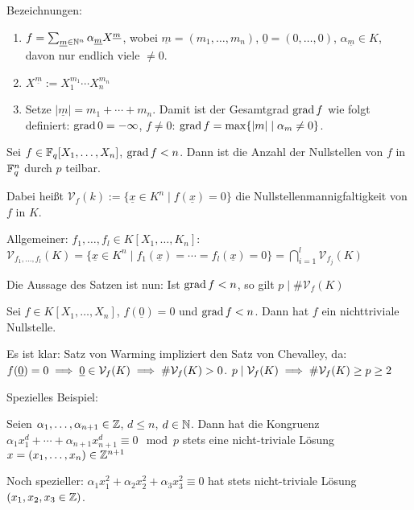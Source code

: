 \documentclass[a4paper,twoside,DIV15,BCOR12mm]{scrbook}
\begin{document}
Bezeichnungen:
\begin{enumerate}
\item $f = \sum_{\underline m\in\mathbb{N}^n} \alpha_{\underline m}X ^{\underline m}$, wobei $\underline m = (m_1, \ldots, m_n)$, $\underline 0 = (0,\ldots,0)$, $\alpha_{\underline m} \in K$, davon nur endlich viele $\ne 0$.
\item $X^{\underline m} := X_1^{m_1}\cdots X_n^{m_n}$
\item Setze $|\underline m| = m_1 + \cdots + m_n$. Damit ist der Gesamtgrad $\mathop{\mathrm{grad}}\nolimits f$ wie folgt definiert: $\mathop{\mathrm{grad}}\nolimits 0 = -\infty$, $f\ne 0$: $\mathop{\mathrm{grad}}\nolimits f = \max\{|m| \mid \alpha_{m} \ne 0\}$.
\end{enumerate}

\begin{satz}
Sei $f\in\mathbb{F}_q[X_1,\ldots,X_n]$, $\mathop{\mathrm{grad}}\nolimits f < n$. Dann ist die Anzahl der Nullstellen von $f$ in $\mathbb{F}_q^n$ durch $p$ teilbar.

Dabei heißt $\mathcal{V}_f(k) := \{\underline x\in K^n \mid f(\underline x) = 0\}$ die Nullstellenmannigfaltigkeit von $f$ in $K$.

Allgemeiner: $f_1,\ldots,f_l \in K[X_1,\ldots,K_n]$: $\mathcal{V}_{f_1,\ldots,f_l}(K)=\{\underline x \in K^n \mid f_1(\underline x)= \cdots =  f_l(\underline x) = 0\}  = \bigcap_{i=1}^l \mathcal{V}_{f_j}(K)$

Die Aussage des Satzen ist nun: Ist $\mathop{\mathrm{grad}}\nolimits f < n$, so gilt $p \mid \#\mathcal{V}_f(K)$
\end{satz}

\begin{satz}
Sei $f\in K[X_1,\ldots,X_n]$, $f(\underline 0) = 0$ und $\mathop{\mathrm{grad}}\nolimits f < n$. Dann hat $f$ ein nichttriviale Nullstelle.
\end{satz}

Es ist klar: Satz von Warming impliziert den Satz von Chevalley, da: $f(\underline 0) = 0 \implies \underline 0 \in \mathcal{V}_f(K) \implies \#\mathcal{V}_f(K)>0$. $p\mid \mathcal{V}_f(K) \implies \#\mathcal{V}_f(K) \ge p \ge 2$

Spezielles Beispiel:
\begin{satz}
Seien $\alpha_1,\ldots,\alpha_{n+1} \in \mathbb{Z}$, $d\le n$, $d\in\mathbb{N}$. Dann hat die Kongruenz $\alpha_1 x_1^d + \cdots + \alpha_{n+1}x_{n+1}^d \equiv 0 \mod p$ stets eine nicht-triviale Lösung $x=(x_1,\ldots,x_n)\in\mathbb{Z}^{n+1}$
\end{satz}

Noch spezieller: $\alpha_1x_1^2 + \alpha_2x_2^2 + \alpha_3x_3^2\equiv 0$ hat stets nicht-triviale Lösung $(x_1,x_2,x_3 \in \mathbb{Z})$.
\end{document}
